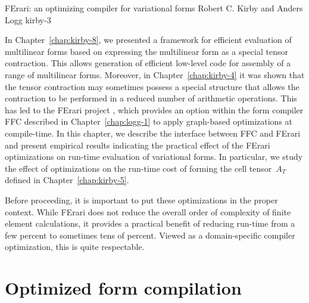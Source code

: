               {FErari: an optimizing compiler for variational forms}
              {Robert C. Kirby and Anders Logg}
              {kirby-3}

In Chapter~\ref{chap:kirby-8}, we presented a framework for
efficient evaluation of multilinear forms based on expressing
the multilinear form as a special tensor contraction. This allows
generation of efficient low-level code for assembly of a range of
multilinear forms. Moreover, in Chapter~\ref{chap:kirby-4} it was
shown that the tensor contraction may sometimes possess a special
structure that allows the contraction to be performed in a reduced
number of arithmetic operations. This has led to the FErari project
\citep{KirbyKnepleyLoggEtAl2005,KirbyLoggScottEtAl2006,KirbyScott2007,KirbyLogg2008},
which provides an option within the form compiler FFC described
in Chapter~\ref{chap:logg-1} to apply graph-based optimizations at
compile-time. In this chapter, we describe the interface between FFC and
FErari and present empirical results indicating the practical effect of
the FErari optimizations on run-time evaluation of variational forms. In
particular, we study the effect of optimizations on the run-time cost
of forming the cell tensor~$A_T$ defined in Chapter~\ref{chap:kirby-5}.

Before proceeding, it is important to put these optimizations in the
proper context. While FErari does not reduce the overall order of
complexity of finite element calculations, it provides a practical
benefit of reducing run-time from a few percent to sometimes tens of
percent. Viewed as a domain-specific compiler optimization, this is
quite respectable.

\section{Optimized form compilation}

